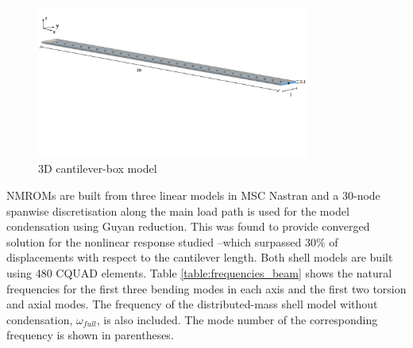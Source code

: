 \documentclass[11pt]{article}
\begin{document}
\begin{figure}[h!]
\centering
\includegraphics[width=0.8\textwidth]{./img/cantilever30e}
\caption{3D cantilever-box model}\label{fig:cantilever}
\end{figure}
%
NMROMs are built from three linear models in MSC Nastran and a 30-node spanwise discretisation along the main load path is used for the model condensation using Guyan reduction. This was found to provide converged solution for the nonlinear response studied --which surpassed 30$\%$ of displacements with respect to the cantilever length. Both shell models are built using 480 CQUAD elements. Table \ref{table:frequencies_beam} shows the natural frequencies for the first three bending modes in each axis and the first two torsion and axial modes. The frequency of the distributed-mass shell model  without condensation, $\omega_{full}$, is also included. The mode number of the corresponding frequency is shown in parentheses.
\end{document}
